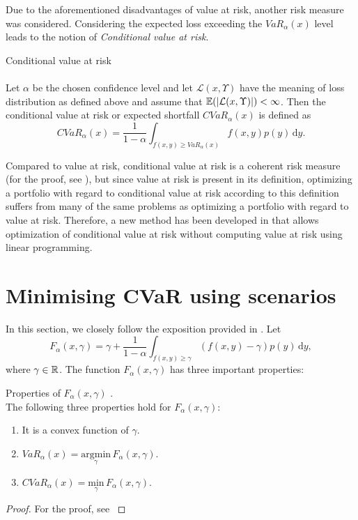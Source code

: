 Due to the aforementioned disadvantages of value at risk, another risk measure was considered.
Considering the expected loss exceeding the $VaR_{\alpha}(x)$ level leads to the notion of \textit{Conditional value at risk}. 

\begin{defn}{Conditional value at risk} 
\label{cvar_definition}
\\  
\cite[p. 275]{cornuejols_tutuncu_2006}
\\
Let $\alpha$ be the chosen confidence level and let $\mathcal{L}(x,\Upsilon)$ have the meaning of loss distribution as defined above and assume that $\mathbb{E}(\left|{\mathcal{L}(x,\Upsilon)}\right|)<\infty$. Then the conditional value at risk or expected shortfall $CVaR_{\alpha}(x)$ is defined as
\begin{equation}
CVaR_{\alpha}(x)=\frac{1}{1-\alpha}\int_{f(x,y) \geq VaR_{\alpha}(x)} f(x,y)p(y) \, \mathrm{d} y.
\end{equation}
\end{defn}
Compared to value at risk, conditional value at risk is a coherent risk measure (for the proof, see \cite[Example 2.26.]{mcneil2015quantitative}), but since value at risk is present in its definition, optimizing a portfolio with regard to conditional value at risk according to this definition suffers from many of the same problems as optimizing a portfolio with regard to value at risk. Therefore, a new method has been developed in \cite{Rockafellar2000OptimizationOC} that allows optimization of conditional value at risk without computing value at risk using linear programming.
\newpage
\section{Minimising CVaR using scenarios}
In this section, we closely follow the exposition provided in \cite[p. 275-278]{cornuejols_tutuncu_2006}.
Let
\begin{equation}
\label{eq:cvar_approx}
F_{\alpha}(x,\gamma)=\gamma + \frac{1}{1-\alpha} \int_{f(x,y) \geq \gamma} (f(x,y)-\gamma)p(y) \, \mathrm{d}y,
\end{equation}
where $\gamma \in \mathbb{R}$.
The function $F_{\alpha}(x,\gamma)$ has three important properties:
\begin{lemma}{Properties of $F_{\alpha}(x,\gamma)$ \cite[p. 276]{cornuejols_tutuncu_2006}.}
\label{lemma:properties_of_cvar_approx} 
\\
The following three properties hold for $F_{\alpha}(x,\gamma)$:
\begin{enumerate}
	\item It is a convex function of $\gamma$.
	\item $VaR_{\alpha}(x)=\underset{\gamma}{\mathrm{argmin}} \, F_{\alpha}(x,\gamma)$.
	\item $ CVaR_{\alpha}(x) = \underset{\gamma}{\mathrm{min}} \, F_{\alpha}(x,\gamma)$.
\end{enumerate}
\end{lemma}
\begin{proof}
For the proof, see \cite[Theorems 1 and 2]{Rockafellar2000OptimizationOC}
\end{proof}
